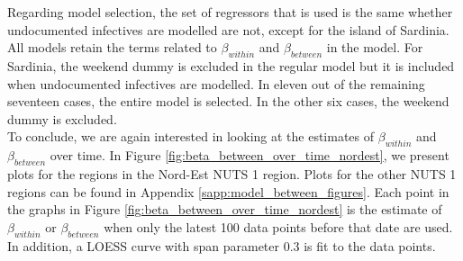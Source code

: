 \documentclass[12pt]{article}
\begin{document}
    Regarding model selection, the set of regressors that is used is the same whether undocumented infectives are modelled are not, except for the island of Sardinia. All models retain the terms related to $\beta_{within}$ and $\beta_{between}$ in the model. For Sardinia, the weekend dummy is excluded in the regular model but it is included when undocumented infectives are modelled. In eleven out of the remaining seventeen cases, the entire model is selected. In the other six cases, the weekend dummy is excluded. \\
    
    To conclude, we are again interested in looking at the estimates of $\beta_{within}$ and $\beta_{between}$ over time. In Figure \ref{fig:beta_between_over_time_nordest}, we present plots for the regions in the Nord-Est NUTS 1 region. Plots for the other NUTS 1 regions can be found in Appendix \ref{sapp:model_between_figures}. Each point in the graphs in Figure \ref{fig:beta_between_over_time_nordest} is the estimate of $\beta_{within}$ or $\beta_{between}$ when only the latest 100 data points before that date are used. In addition, a LOESS curve with span parameter 0.3 is fit to the data points.
    
\end{document}
